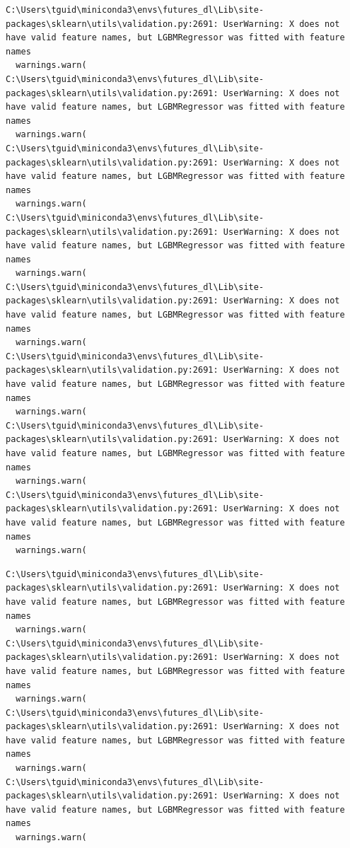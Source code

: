 \begin{verbatim}
C:\Users\tguid\miniconda3\envs\futures_dl\Lib\site-packages\sklearn\utils\validation.py:2691: UserWarning: X does not have valid feature names, but LGBMRegressor was fitted with feature names
  warnings.warn(
C:\Users\tguid\miniconda3\envs\futures_dl\Lib\site-packages\sklearn\utils\validation.py:2691: UserWarning: X does not have valid feature names, but LGBMRegressor was fitted with feature names
  warnings.warn(
C:\Users\tguid\miniconda3\envs\futures_dl\Lib\site-packages\sklearn\utils\validation.py:2691: UserWarning: X does not have valid feature names, but LGBMRegressor was fitted with feature names
  warnings.warn(
C:\Users\tguid\miniconda3\envs\futures_dl\Lib\site-packages\sklearn\utils\validation.py:2691: UserWarning: X does not have valid feature names, but LGBMRegressor was fitted with feature names
  warnings.warn(
C:\Users\tguid\miniconda3\envs\futures_dl\Lib\site-packages\sklearn\utils\validation.py:2691: UserWarning: X does not have valid feature names, but LGBMRegressor was fitted with feature names
  warnings.warn(
C:\Users\tguid\miniconda3\envs\futures_dl\Lib\site-packages\sklearn\utils\validation.py:2691: UserWarning: X does not have valid feature names, but LGBMRegressor was fitted with feature names
  warnings.warn(
C:\Users\tguid\miniconda3\envs\futures_dl\Lib\site-packages\sklearn\utils\validation.py:2691: UserWarning: X does not have valid feature names, but LGBMRegressor was fitted with feature names
  warnings.warn(
C:\Users\tguid\miniconda3\envs\futures_dl\Lib\site-packages\sklearn\utils\validation.py:2691: UserWarning: X does not have valid feature names, but LGBMRegressor was fitted with feature names
  warnings.warn(
\end{verbatim}

\begin{verbatim}
C:\Users\tguid\miniconda3\envs\futures_dl\Lib\site-packages\sklearn\utils\validation.py:2691: UserWarning: X does not have valid feature names, but LGBMRegressor was fitted with feature names
  warnings.warn(
C:\Users\tguid\miniconda3\envs\futures_dl\Lib\site-packages\sklearn\utils\validation.py:2691: UserWarning: X does not have valid feature names, but LGBMRegressor was fitted with feature names
  warnings.warn(
C:\Users\tguid\miniconda3\envs\futures_dl\Lib\site-packages\sklearn\utils\validation.py:2691: UserWarning: X does not have valid feature names, but LGBMRegressor was fitted with feature names
  warnings.warn(
C:\Users\tguid\miniconda3\envs\futures_dl\Lib\site-packages\sklearn\utils\validation.py:2691: UserWarning: X does not have valid feature names, but LGBMRegressor was fitted with feature names
  warnings.warn(
\end{verbatim}

